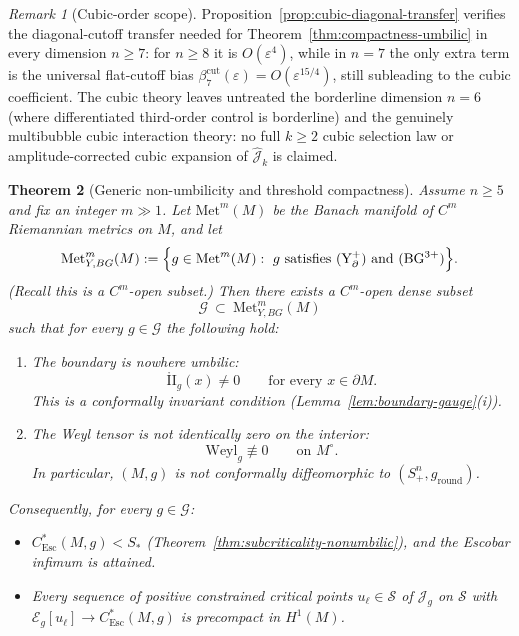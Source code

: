 \documentclass[11pt,reqno,a4paper]{amsart}
\numberwithin{equation}{section}
\theoremstyle{plain}
\newtheorem{theorem}{Theorem}[section]
\newcommand{\Esc}{\ensuremath{\mathrm{Esc}}}
\theoremstyle{remark}
\newtheorem{remark}[theorem]{Remark}
\theoremstyle{plain}
\begin{document}
\begin{remark}[Cubic-order scope]
\label{rem:cubic-open}
Proposition~\ref{prop:cubic-diagonal-transfer} verifies the diagonal-cutoff transfer needed for
Theorem~\ref{thm:compactness-umbilic} in every dimension $n\ge7$:
for $n\ge8$ it is $O(\varepsilon^4)$, while in $n=7$ the only extra term is the universal
flat-cutoff bias $\beta_7^{\mathrm{cut}}(\varepsilon)=O(\varepsilon^{15/4})$,
still subleading to the cubic coefficient.
The cubic theory leaves untreated the borderline dimension $n=6$
(where differentiated third-order control is borderline)
and the genuinely multibubble cubic interaction theory:
no full $k\ge2$ cubic selection law or amplitude-corrected cubic expansion of
$\hat{\mathcal J}_k$ is claimed.
\end{remark}


\begin{theorem}[Generic non-umbilicity and threshold compactness]
\label{thm:generic-compactness}
Assume $n\ge5$ and fix an integer $m\gg1$.
Let $\mathrm{Met}^m(M)$ be the Banach manifold of $C^m$ Riemannian metrics on $M$, and let
\[
\mathrm{Met}^m_{Y,BG}(M)
:=\Big\{g\in\mathrm{Met}^m(M):\ g\ \text{satisfies \textup{(Y$^+_{\partial}$)} and \textup{(BG$^{3+}$)}}\Big\}.
\]
(Recall this is a $C^m$-open subset.)
Then there exists a $C^m$-open dense subset
\[
  \mathcal{G}\ \subset\ \mathrm{Met}^m_{Y,BG}(M)
\]
such that for every $g\in\mathcal{G}$ the following hold:
\begin{enumerate}[label=\textup{(\alph*)},leftmargin=1.5em]
\item The boundary is nowhere umbilic:
\[
\mathring{\mathrm{II}}_g(x)\neq0
\qquad\text{for every }x\in\partial M.
\]
This is a conformally invariant condition (Lemma~\ref{lem:boundary-gauge}(i)).
\item The Weyl tensor is not identically zero on the interior:
\[
  \mathrm{Weyl}_g\not\equiv0\qquad\text{on }M^\circ.
\]
In particular, $(M,g)$ is not conformally diffeomorphic to
$(S^n_+,g_{\mathrm{round}})$.
\end{enumerate}

\smallskip
Consequently, for every $g\in\mathcal G$:
\begin{itemize}
\item $C^*_{\Esc}(M,g)<S_\ast$
(Theorem~\ref{thm:subcriticality-nonumbilic}), and the Escobar infimum is attained.
\item Every sequence of \emph{positive} constrained critical points
$u_\ell\in\mathcal S$ of $\mathcal J_g$ on $\mathcal S$
with $\mathcal E_g[u_\ell]\to C^*_{\Esc}(M,g)$ is precompact in $H^1(M)$.
\end{itemize}
\end{theorem}
\end{document}
